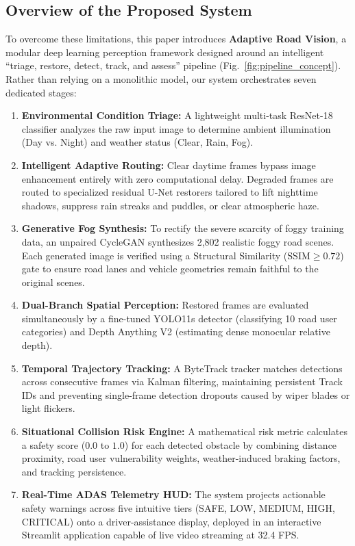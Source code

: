 \documentclass[conference]{IEEEtran}
\begin{document}
\subsection{Overview of the Proposed System}
To overcome these limitations, this paper introduces \textbf{Adaptive Road Vision}, a modular deep learning perception framework designed around an intelligent ``triage, restore, detect, track, and assess'' pipeline (Fig.~\ref{fig:pipeline_concept}). Rather than relying on a monolithic model, our system orchestrates seven dedicated stages:
\begin{enumerate}
    \item \textbf{Environmental Condition Triage:} A lightweight multi-task ResNet-18 classifier analyzes the raw input image to determine ambient illumination (Day vs. Night) and weather status (Clear, Rain, Fog).
    \item \textbf{Intelligent Adaptive Routing:} Clear daytime frames bypass image enhancement entirely with zero computational delay. Degraded frames are routed to specialized residual U-Net restorers tailored to lift nighttime shadows, suppress rain streaks and puddles, or clear atmospheric haze.
    \item \textbf{Generative Fog Synthesis:} To rectify the severe scarcity of foggy training data, an unpaired CycleGAN synthesizes 2,802 realistic foggy road scenes. Each generated image is verified using a Structural Similarity ($\text{SSIM} \ge 0.72$) gate to ensure road lanes and vehicle geometries remain faithful to the original scenes.
    \item \textbf{Dual-Branch Spatial Perception:} Restored frames are evaluated simultaneously by a fine-tuned YOLO11s detector (classifying 10 road user categories) and Depth Anything V2 (estimating dense monocular relative depth).
    \item \textbf{Temporal Trajectory Tracking:} A ByteTrack tracker matches detections across consecutive frames via Kalman filtering, maintaining persistent Track IDs and preventing single-frame detection dropouts caused by wiper blades or light flickers.
    \item \textbf{Situational Collision Risk Engine:} A mathematical risk metric calculates a safety score ($0.0$ to $1.0$) for each detected obstacle by combining distance proximity, road user vulnerability weights, weather-induced braking factors, and tracking persistence.
    \item \textbf{Real-Time ADAS Telemetry HUD:} The system projects actionable safety warnings across five intuitive tiers (SAFE, LOW, MEDIUM, HIGH, CRITICAL) onto a driver-assistance display, deployed in an interactive Streamlit application capable of live video streaming at 32.4 FPS.
\end{enumerate}
\end{document}

